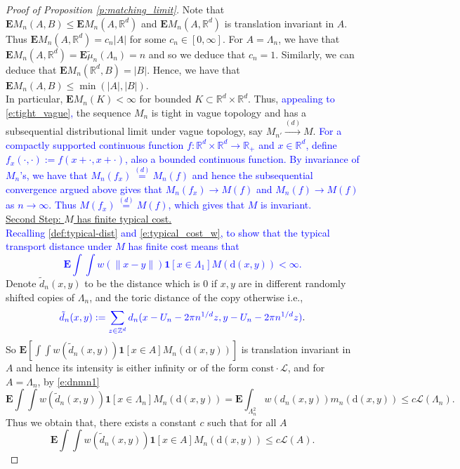 \documentclass[12pt]{article}
\newcommand{\R}{\mathbb{R}}
\newcommand{\Z}{\mathbb{Z}}
\newcommand{\Leb}{\mathcal{L}}
\newcommand{\equlaw}{\stackrel{(d)}{=}}
\newcommand{\convlaw}{\stackrel{(d)}{\to}}
\newcommand{\1}{\mathbf{1}}
\newcommand{\md}{\mathrm{d}}
\newcommand{\tmu}{\tilde{\mu}}
\newcommand{\E}{\mathbf  E}
\newcommand{\RL}[1]{\textcolor{blue}{#1}}
\newcommand{\dy}[1]{\textcolor{blue}{#1}}
\newcommand{\RL}[1]{#1}%
\newcommand{\dy}[1]{#1}%
\begin{document}
{{{{{\begin{proof}[Proof of Proposition \ref{p:matching_limit}]
Note that $\E M_n(A,B) \leqslant \E M_n(A,\R^d)$ and $\E M_n(A,\R^d)$ is translation invariant in $A$. Thus $\E M_n(A,\R^d) = c_{n}|A|$ for some $c_{n} \in [0,\infty]$. For $A = \Lambda_n$, we have that  $\E M_n(A,\R^d) = \E \tmu_n(\Lambda_n) = n$ and so we deduce that $c_{ n} = 1$. Similarly, we can deduce that $\E M_n(\R^d,B) = |B|$. Hence, we have that $\mathbf{E} M_{n}(A,B)\leqslant \min(| A | , | B | )$. \\

In particular, $ \mathbf{E}M_{n}(K)<\infty $ for bounded $K \subset \R^d \times \R^d$. Thus, \dy{appealing to \eqref{e:tight_vague},} the sequence $M_n$ is tight in vague topology  and has a subsequential distributional limit under vague topology, say $M_{n'} \convlaw M$. \dy{For a compactly supported continuous function $f : \R^d \times \R^d \to \R_+$ and $x \in \R^d$, define $f_x(\cdot,\cdot) := f(x+\cdot,x+\cdot)$, 
also a bounded continuous function. By invariance of $M_n$'s, we have that $M_n(f_x) \equlaw M_n(f)$ and hence the subsequential convergence argued above gives that $M_n(f_x) \to M(f)$ and $M_n(f) \to M(f)$ as $n \to \infty$. Thus $M(f_x) \equlaw M(f)$, which gives that $M$ is invariant.} \\

\underline{{Second Step: $M$ has finite typical cost.}}  \\
%
\dy{Recalling \eqref{def:typical-dist} and \eqref{e:typical_cost_w}, to show that the typical transport distance under \RL{$ M$} has finite cost means that
%
\begin{equation}
\label{e:typ_M_cost}
\E \int \int w(\|x-y\|) \1[x \in \Lambda_1] M(\md (x,y)) < \infty.
\end{equation}
%
}
%
Denote $ \tilde d_{n}(x,y)$ to be the distance which is $ 0$ if $ x,y$ are in different {randomly shifted copies of $\Lambda_n$}, and the toric distance of the copy otherwise i.e.,
%
$$ \dy{ \tilde d_{n}(x,y) := \sum_{z \in \Z^d} d_n(x-U_n-{2\pi}n^{1/d}z,y-U_n-{2\pi}n^{1/d}z)}.$$
%
So $\E[\int \int w(\tilde d_{n}(x,y))\1[x \in A] M_n(\md (x,y))]$ is translation invariant in $A$ and hence its intensity is either infinity or of the form $ \textrm{const}\cdot \Leb$, and for $A = \Lambda_n$,  by \eqref{e:dnmn1}
%
$$ \E \int \int w(\tilde d_{n}(x,y))\1[x \in \Lambda_n] M_n(\md (x,y)) = \E \int _{\Lambda _{n}^{2}} w({d_{n}(x,y)}) m_n(\md (x,y)) \leqslant c \Leb(\Lambda_n).$$
%
Thus we obtain that, there exists a constant $c$ such that for all $A$
%
\begin{equation}
\label{e:WpMnA1}
\E \int \int w(\tilde d_{n}(x,y))\1[x \in A] M_n(\md (x,y)) \leqslant c \Leb(A).
\end{equation}
%


\end{proof}}}}}}
\end{document}
